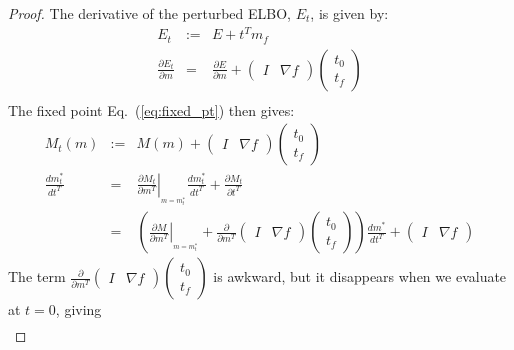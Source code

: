 \documentclass{article}\usepackage[]{graphicx}\usepackage[]{color}
\newcommand{\eq}[1]{Eq.~(\ref{eq:#1})}
\begin{document}
\begin{proof}
  The derivative of the perturbed ELBO, $E_t$, is given by:
  \begin{eqnarray*}
  E_{t} & := & E+t^{T}m_{f}\\
  \frac{\partial E_{t}}{\partial m} & = &
  \frac{\partial E}{\partial m}+\left(\begin{array}{cc}
  I & \nabla f\end{array}\right)\left(\begin{array}{c}
  t_{0}\\
  t_{f}
  \end{array}\right)\\
  \end{eqnarray*}
  The fixed point \eq{fixed_pt} then gives:
  \begin{eqnarray*}
  M_{t}\left(m\right) & := & M\left(m\right)+\left(\begin{array}{cc}
  I & \nabla f\end{array}\right)\left(\begin{array}{c}
  t_{0}\\
  t_{f}
  \end{array}\right)\\
  \frac{dm_{t}^{*}}{dt^{T}} & = &
    \left.\frac{\partial M_{t}}{\partial m^{T}}\right|_{_{m=m_{t}^{*}}}
    \frac{dm_{t}^{*}}{dt^{T}}+\frac{\partial M_{t}}{\partial t^{T}}\\
   & = & \left(\left.\frac{\partial M}{\partial m^{T}}\right|_{_{m=m_{t}^{*}}}+
   \frac{\partial}{\partial m^{T}}\left(\begin{array}{cc}
  I & \nabla f\end{array}\right)\left(\begin{array}{c}
  t_{0}\\
  t_{f}
  \end{array}\right)\right)\frac{dm^{*}}{dt^{T}}+\left(\begin{array}{cc}
  I & \nabla f\end{array}\right)
  \end{eqnarray*}
  The term $\frac{\partial}{\partial m^{T}}\left(\begin{array}{cc}
  I & \nabla f\end{array}\right)\left(\begin{array}{c}
  t_{0}\\
  t_{f}
  \end{array}\right)$ is awkward, but it disappears when we evaluate at $t=0$,
  giving
  \begin{eqnarray*}

\end{eqnarray*}
\end{proof}
\end{document}
